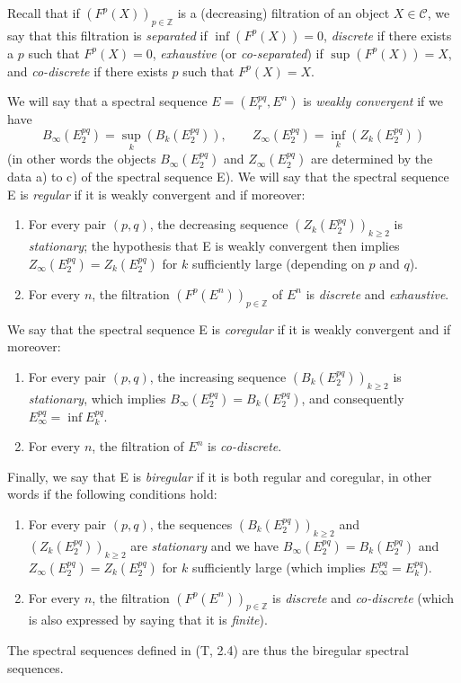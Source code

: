 \begin{env}[11.1.3]
\label{0.11.1.3}
Recall that if $(F^p(X))_{p\in\mathbb Z}$ is a (decreasing) filtration
of an object $X\in\mathcal C$, we say that this filtration is \emph{separated}
if $\inf(F^p(X))=0$, \emph{discrete} if there exists a $p$ such that $F^p(X)=0$,
\emph{exhaustive} (or \emph{co-separated}) if $\sup(F^p(X))=X$, and
\emph{co-discrete} if there exists $p$ such that $F^p(X)=X$.

We will say that a spectral sequence $E=(E_r^{pq},E^n)$ is \emph{weakly
convergent} if we have
\[
  B_\infty(E_2^{pq})=\sup_k(B_k(E_2^{pq})),\qquad
  Z_\infty(E_2^{pq})=\inf_k(Z_k(E_2^{pq}))
\]
(in other words the objects $B_\infty(E_2^{pq})$ and $Z_\infty(E_2^{pq})$
are determined by the data a) to c) of the spectral sequence E). We will say
that the spectral sequence E is \emph{regular} if it is weakly
convergent and if moreover:
\begin{enumerate}
  \item[$1^\circ$] For every pair $(p,q)$, the decreasing sequence
    $(Z_k(E_2^{pq}))_{k\geq2}$ is \emph{stationary}; the hypothesis that E
    is weakly convergent then implies
    $Z_\infty(E_2^{pq})=Z_k(E_2^{pq})$ for $k$ sufficiently large (depending on
    $p$ and $q$).
  \item[$2^\circ$] For every $n$, the filtration
    $(F^p(E^n))_{p\in\mathbb Z}$ of $E^n$ is \emph{discrete} and
    \emph{exhaustive}.
\end{enumerate}

We say that the spectral sequence E is \emph{coregular} if it is
weakly convergent and if moreover:
\begin{enumerate}
  \item[$3^\circ$] For every pair $(p,q)$, the increasing sequence
    $(B_k(E_2^{pq}))_{k\geq2}$ is \emph{stationary}, which implies
    $B_\infty(E_2^{pq})=B_k(E_2^{pq})$, and consequently
    $E_\infty^{pq}=\inf E_k^{pq}$.
  \item[$4^\circ$] For every $n$, the filtration of $E^n$ is
    \emph{co-discrete}.
\end{enumerate}

Finally, we say that E is \emph{biregular} if it is both regular
and coregular, in other words if the following conditions hold:
\begin{enumerate}
  \item[(a)] For every pair $(p,q)$, the sequences
    $(B_k(E_2^{pq}))_{k\geq2}$ and $(Z_k(E_2^{pq}))_{k\geq2}$ are
    \emph{stationary} and we have
    $B_\infty(E_2^{pq})=B_k(E_2^{pq})$ and
    $Z_\infty(E_2^{pq})=Z_k(E_2^{pq})$ for $k$ sufficiently large (which implies
    $E_\infty^{pq}=E_k^{pq}$).
  \item[(b)] For every $n$, the filtration $(F^p(E^n))_{p\in\mathbb Z}$ is
    \emph{discrete} and \emph{co-discrete} (which is also expressed by saying
    that it is \emph{finite}).
\end{enumerate}

The spectral sequences defined in (T, 2.4) are thus the biregular
spectral sequences.
\end{env}

